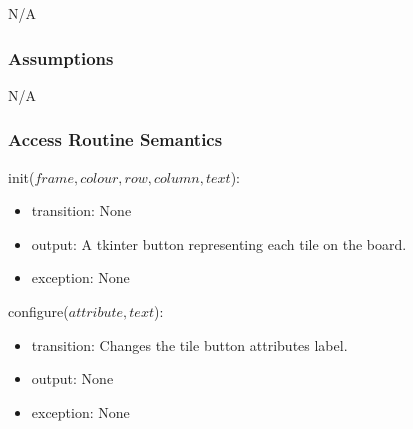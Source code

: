 \documentclass[12pt]{article}
\begin{document}
N/A

\subsubsection*{Assumptions}

N/A

\subsubsection* {Access Routine Semantics}

\noindent init($frame, colour, row, column, text$):
\begin{itemize}
\item transition: None
\item output: A tkinter button representing each tile on the board.
\item exception: None
\end{itemize}

\noindent configure($attribute, text$):
\begin{itemize}
\item transition: Changes the tile button attributes label.
\item output: None
\item exception: None
\end{itemize}
\end{document}

